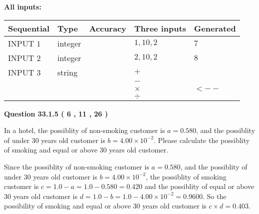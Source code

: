 \documentclass[12pt]{article}
\begin{document}
   
   
   
\noindent\vspace{0.1in}\hspace{-0.08in} {\textbf{\Large{All inputs: }}}
   
   
  
  
\noindent\begin{tabular}{|l|l|l|l|l|}
\hline
 Sequential & Type & Accuracy & Three inputs & Generated \\ 
\hline
 
 
  INPUT $            1 $ & integer &  & $
 1
 , 
 10
 , 
 2
 $ & $ 7 $ 
 \\  \hline  
 
 
  INPUT $            2 $ & integer &  & $
 2
 , 
 10
 , 
 2
 $ & $ 8 $ 
 \\  \hline  
 
 
  INPUT $            3 $ & string & & 
 $+$ & 
  \\
  & & & 
 $-$ & 
  \\
  & & & 
 $\times$ & 
  $ <-- $ 
  \\
  & & & 
 $\div$ & 
 \\  \hline  
 \end{tabular}
   
   
  
\vspace{0.2in}
  
{\textbf{\Large{Question
33.1.5 
 (           6 ,          11 ,          26 )
}}}
  
  
In a hotel, the possiblity of  %
non-smoking customer is
$a =  %
0.580$, and the possiblity of  %
 under 30 years old customer is $ b =  %
4.00 \times 10^{-2}$.
Please calculate the possiblity of  %
smoking and  %
equal or above 30 years old customer.
 
 
 
\noindent{}
 
 

Since the possiblity of  %
 non-smoking customer is $ a =  %
0.580 $,
and the possiblity of  %
 under 30 years old customer is $ b =  %
4.00 \times 10^{-2} $,
the possiblity of  %
smoking customer is $ c = 1.0 - a = 1.0 -
0.580
=  %
0.420 $ and the possiblity of  %
equal or above 30 years old
customer is $ d = 1.0 - b = 1.0 -  %
4.00 \times 10^{-2} =  %
0.9600  $.
So the possibility of  %
smoking and  %
equal or above 30 years old
customer is $ c \times d =  %
0.403 $.
 
\end{document}
